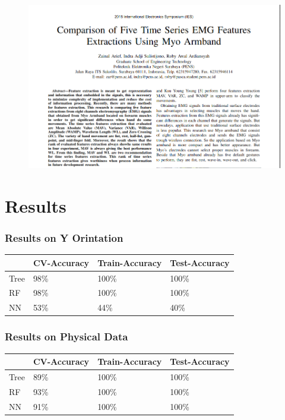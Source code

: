 \documentclass{beamer}
\begin{document}
\begin{frame}

\begin{figure}
	\includegraphics[scale=.35]{emg_fe}
\end{figure}

\end{frame}

\section{Results}

\begin{frame}
\frametitle{Results on Y Orintation}

\begin{tabular}{ |p{2cm}|p{2cm}||p{2cm}|p{2cm}|  }
 \hline
 &CV-Accuracy & Train-Accuracy & Test-Accuracy \\
 \hline
 Tree & 98\% & 100\%  & 100\% \\
 \hline
 RF & 98\%    & 100\%   & 100\% \\
 \hline
 NN & 53\%   & 44\%  & 40\% \\
 \hline
\end{tabular}

\end{frame}

\begin{frame}
\frametitle{Results on Physical Data}


\begin{tabular}{ |p{2cm}|p{2cm}||p{2cm}|p{2cm}|  }
 \hline
 &CV-Accuracy & Train-Accuracy & Test-Accuracy \\
 \hline
 Tree & 89\% & 100\%  & 100\% \\
 \hline
 RF & 93\%    & 100\%   & 100\% \\
 \hline
 NN & 91\%   & 100\%  & 100\% \\
 \hline
\end{tabular}

\end{frame}
\end{document}
